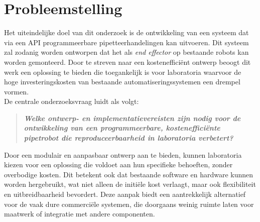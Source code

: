 \section{Probleemstelling}
Het uiteindelijke doel van dit onderzoek is de ontwikkeling van een systeem dat via een API programmeerbare pipetteerhandelingen kan uitvoeren. Dit systeem zal zodanig worden ontworpen dat het als \textit{end effector} op bestaande robots kan worden gemonteerd. Door te streven naar een kostenefficiënt ontwerp beoogt dit werk een oplossing te bieden die toegankelijk is voor laboratoria waarvoor de hoge investeringskosten van bestaande automatiseringssystemen een drempel vormen.
\\[12pt]De centrale onderzoeksvraag luidt als volgt:
\begin{quote}
    \begin{center}
        \textbf{\textit{Welke ontwerp- en implementatievereisten zijn nodig voor de ontwikkeling van een programmeerbare, kostenefficiënte pipetrobot die reproduceerbaarheid in laboratoria verbetert?}}
    \end{center}
\end{quote}

Door een modulair en aanpasbaar ontwerp aan te bieden, kunnen laboratoria kiezen voor een oplossing die voldoet aan hun specifieke behoeften, zonder overbodige kosten. Dit betekent ook dat bestaande software en hardware kunnen worden hergebruikt, wat niet alleen de initiële kost verlaagt, maar ook flexibiliteit en uitbreidbaarheid bevordert. Deze aanpak biedt een aantrekkelijk alternatief voor de vaak dure commerciële systemen, die doorgaans weinig ruimte laten voor maatwerk of integratie met andere componenten.
